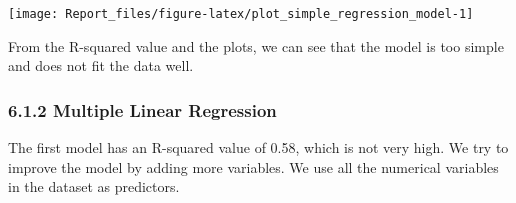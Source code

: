 \documentclass[
]{article}
\newenvironment{Shaded}{\begin{snugshade}}{\end{snugshade}}
\newcommand{\AttributeTok}[1]{\textcolor[rgb]{0.13,0.29,0.53}{#1}}
\newcommand{\DecValTok}[1]{\textcolor[rgb]{0.00,0.00,0.81}{#1}}
\newcommand{\FunctionTok}[1]{\textcolor[rgb]{0.13,0.29,0.53}{\textbf{#1}}}
\newcommand{\NormalTok}[1]{#1}
\newcommand{\OtherTok}[1]{\textcolor[rgb]{0.56,0.35,0.01}{#1}}
\newcommand{\SpecialCharTok}[1]{\textcolor[rgb]{0.81,0.36,0.00}{\textbf{#1}}}
\newcommand{\StringTok}[1]{\textcolor[rgb]{0.31,0.60,0.02}{#1}}
\begin{document}
\begin{Shaded}
\end{Shaded}

\begin{center}\texttt{[image: Report\_files/figure-latex/plot\_simple\_regression\_model-1]} \end{center}

From the R-squared value and the plots, we can see that the model is too
simple and does not fit the data well.

\hypertarget{multiple-linear-regression}{%
\subsubsection{6.1.2 Multiple Linear
Regression}\label{multiple-linear-regression}}

The first model has an R-squared value of 0.58, which is not very high.
We try to improve the model by adding more variables. We use all the
numerical variables in the dataset as predictors.

\begin{Shaded}
\end{Shaded}
\end{document}
